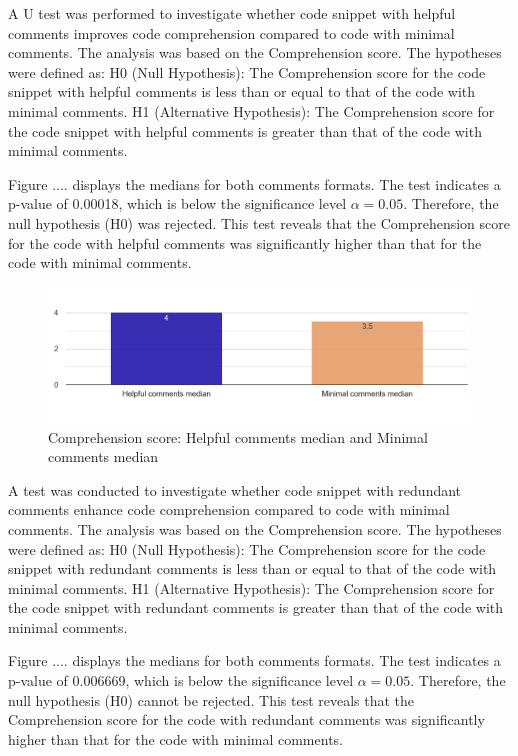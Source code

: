 A U test was performed to investigate whether code snippet with helpful comments improves code comprehension compared to code with minimal comments. The analysis was based on the Comprehension score. The hypotheses were defined as: H0 (Null Hypothesis): The Comprehension score for the code snippet with helpful comments is less than or equal to that of the code with minimal comments.  H1 (Alternative Hypothesis): The Comprehension score for the code snippet with helpful comments is greater than that of the code with minimal comments.

Figure .... displays the medians for both comments formats.
The test indicates a p-value of 0.00018, which is below the significance level $\alpha = 0.05$. Therefore, the null hypothesis (H0) was rejected.  This test reveals that the Comprehension score for the code with helpful comments was significantly higher than that for the code with minimal comments. 

\begin{figure} [H]
  \centering
  \includegraphics[scale=0.4]{figures/h-m-q3.png}
  \caption{Comprehension score:  Helpful comments median and Minimal comments median}
  \label{fig:AnhangsChor}
\end{figure}


A test was conducted to investigate whether code snippet with redundant comments enhance code comprehension compared to code with minimal comments. The analysis was based on the Comprehension score. The hypotheses were defined as: H0 (Null Hypothesis): The Comprehension score for the code snippet with redundant comments is less than or equal to that of the code with minimal comments.  H1 (Alternative Hypothesis): The Comprehension score for the code snippet with redundant comments is greater than that of the code with minimal comments. 


Figure .... displays the medians for both comments formats.
The test indicates a p-value of 0.006669, which is below the significance level $\alpha = 0.05$. Therefore, the null hypothesis (H0) cannot be rejected.  This test reveals that the Comprehension score for the code with redundant comments was significantly higher than that for the code with minimal comments. 

